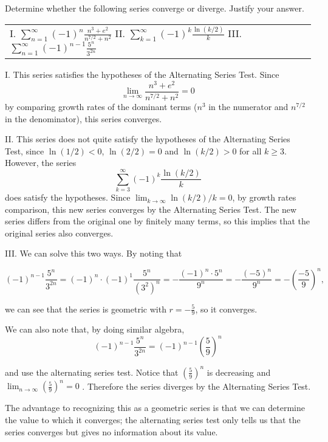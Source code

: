 \documentclass[noauthor]{ximera}
\begin{document}
\begin{problem}
Determine whether the following series converge or diverge. Justify your answer.
\begin{center}
\begin{tabular}{lll}
I. $\sum_{n=1}^\infty (-1)^n \frac{n^3+e^2}{n^{7/2}+n^2}$ \hspace{.2in} II. $\sum_{k=1}^\infty (-1)^k \frac{\ln(k/2)}{k}$ \hspace{.2in} III. $\sum_{n=1}^\infty (-1)^{n-1} \frac{5^n}{3^{2n}}$ 
\end{tabular}
\end{center}

\begin{freeResponse}
I. This series satisfies the hypotheses of the Alternating Series Test. Since 
$$
\lim_{n\rightarrow \infty}  \frac{n^3+e^2}{n^{7/2}+n^2} = 0
$$
by comparing growth rates of the dominant terms ($n^3$ in the numerator and $n^{7/2}$ in the denominator), this series converges.

II. This series does not quite satisfy the hypotheses of the Alternating Series Test, since $\ln(1/2) < 0$, $\ln(2/2) = 0$ and $\ln(k/2) > 0$ for all $k \geq 3$. However, the series
$$
\sum_{k=3}^\infty (-1)^k \frac{\ln(k/2)}{k}
$$
does satisfy the hypotheses. Since $\lim_{k \rightarrow \infty} \ln(k/2)/k = 0$, by growth rates comparison, this new series converges by the Alternating Series Test. The new series differs from the original one by finitely many terms, so this implies that the original series also converges.

III. We can solve this two ways.  By noting that

\[
(-1)^{n-1} \frac{5^n}{3^{2n}} = (-1)^n\cdot(-1)^1 \frac{5^n}{(3^2)^n}=  -\frac{(-1)^n \cdot 5^n}{9^n} =  -\frac{(-5)^n}{9^n}=  -\left(\frac{-5}{9}\right)^n,
\]

we can see that the series is geometric with $r=-\frac{5}{9}$, so it converges.

We can also note that, by doing similar algebra, 
\[
(-1)^{n-1} \frac{5^n}{3^{2n}} = (-1)^{n-1} \left(\frac{5}{9}\right)^n
\]

and use the alternating series test.  Notice that $\left(\frac{5}{9}\right)^n$ is decreasing and $\lim_{n \to \infty} \left(\frac{5}{9}\right)^n=0$ . Therefore the series diverges by the Alternating Series Test.

The advantage to recognizing this as a geometric series is that we can determine the value to which it converges; the alternating series test only tells us that the series converges but gives no information about its value.
\end{freeResponse}
\end{problem}
\end{document}
